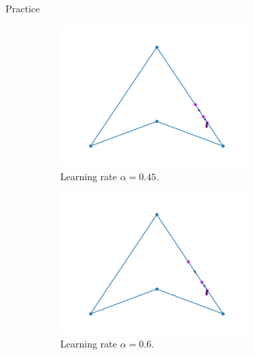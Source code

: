 \documentclass{beamer}
\begin{document}
\begin{frame}{Practice}
	\begin{figure}[h!]
		\centering
		\begin{subfigure}{0.45\textwidth}
			\centering
			\includegraphics[width = 0.8\textwidth]{Images/concave_triangle_gradient_045.png}
			\caption{Learning rate $\alpha = 0.45$.}
			\label{fig:concave_gradient_045}
		\end{subfigure}
		\begin{subfigure}{0.45\textwidth}
			\centering
			\includegraphics[width = 0.8\textwidth]{Images/concave_triangle_gradient_06.png}
			\caption{Learning rate $\alpha = 0.6$.}
			\label{fig:concave_gradient_06}
		\end{subfigure}
		\begin{subfigure}{0.45\textwidth}
			\centering

\end{subfigure}
\end{figure}
\end{frame}
\end{document}
